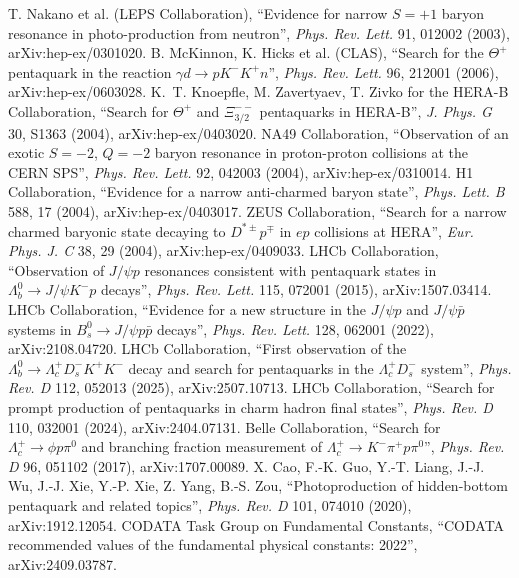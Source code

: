  T. Nakano et al. (LEPS Collaboration), ``Evidence for narrow $S=+1$ baryon resonance in photo-production from
neutron'', \emph{Phys. Rev. Lett.} 91, 012002 (2003), arXiv:hep-ex/0301020.
 B. McKinnon, K. Hicks et al. (CLAS), ``Search for the $\Theta^+$ pentaquark in the reaction $\gamma d\to pK^-K^+n$'',
\emph{Phys. Rev. Lett.} 96, 212001 (2006), arXiv:hep-ex/0603028.
 K.~T. Knoepfle, M. Zavertyaev, T. Zivko for the HERA-B Collaboration, ``Search for $\Theta^+$ and
$\Xi^{--}_{3/2}$ pentaquarks in HERA-B'', \emph{J. Phys. G} 30, S1363 (2004), arXiv:hep-ex/0403020.
 NA49 Collaboration, ``Observation of an exotic $S=-2$, $Q=-2$ baryon resonance in proton-proton collisions at the CERN
SPS'', \emph{Phys. Rev. Lett.} 92, 042003 (2004), arXiv:hep-ex/0310014.
 H1 Collaboration, ``Evidence for a narrow anti-charmed baryon state'', \emph{Phys. Lett. B} 588, 17 (2004),
arXiv:hep-ex/0403017.
 ZEUS Collaboration, ``Search for a narrow charmed baryonic state decaying to $D^{*\pm}p^\mp$ in $ep$ collisions at
HERA'', \emph{Eur. Phys. J. C} 38, 29 (2004), arXiv:hep-ex/0409033.
 LHCb Collaboration, ``Observation of $J/\psi p$ resonances consistent with pentaquark states in
$\Lambda_b^0\to J/\psi K^-p$ decays'', \emph{Phys. Rev. Lett.} 115, 072001 (2015), arXiv:1507.03414.
 LHCb Collaboration, ``Evidence for a new structure in the $J/\psi p$ and $J/\psi\bar p$ systems in
$B_s^0\to J/\psi p\bar p$ decays'', \emph{Phys. Rev. Lett.} 128, 062001 (2022), arXiv:2108.04720.
 LHCb Collaboration, ``First observation of the $\Lambda_b^0\to\Lambda_c^+D_s^-K^+K^-$ decay and search for
pentaquarks in the $\Lambda_c^+D_s^-$ system'', \emph{Phys. Rev. D} 112, 052013 (2025), arXiv:2507.10713.
 LHCb Collaboration, ``Search for prompt production of pentaquarks in charm hadron final states'', \emph{Phys. Rev. D}
110, 032001 (2024), arXiv:2404.07131.
 Belle Collaboration, ``Search for $\Lambda_c^+\to\phi p\pi^0$ and branching fraction measurement of
$\Lambda_c^+\to K^-\pi^+p\pi^0$'', \emph{Phys. Rev. D} 96, 051102 (2017), arXiv:1707.00089.
 X. Cao, F.-K. Guo, Y.-T. Liang, J.-J. Wu, J.-J. Xie, Y.-P. Xie, Z. Yang, B.-S. Zou, ``Photoproduction of hidden-bottom
pentaquark and related topics'', \emph{Phys. Rev. D} 101, 074010 (2020), arXiv:1912.12054.
 CODATA Task Group on Fundamental Constants, ``CODATA recommended values of the fundamental physical constants: 2022'',
arXiv:2409.03787.
